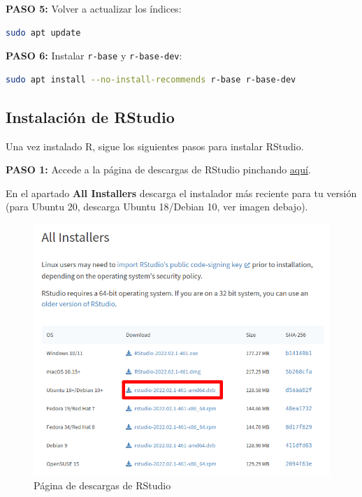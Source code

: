 \documentclass[
  title=normal,
  notoc,
  bib=normal]{mnye}
\newcommand{\passthrough}[1]{#1}
\begin{document}
\textbf{PASO 5: } Volver a actualizar los índices:

\begin{lstlisting}[language=bash]
sudo apt update 
\end{lstlisting}

\textbf{PASO 6: } Instalar \passthrough{\lstinline!r-base!} y \passthrough{\lstinline!r-base-dev!}:

\begin{lstlisting}[language=bash]
sudo apt install --no-install-recommends r-base r-base-dev 
\end{lstlisting}

\hypertarget{instalaciuxf3n-de-rstudio}{%
\subsection{Instalación de RStudio}\label{instalaciuxf3n-de-rstudio}}

Una vez instalado R, sigue los siguientes pasos para instalar RStudio.

\textbf{PASO 1: }
Accede a la página de descargas de RStudio pinchando \href{https://rstudio.com/products/rstudio/download/\#download}{aquí}.

En el apartado \textbf{All Installers} descarga el instalador más reciente para tu versión (para Ubuntu 20, descarga Ubuntu 18/Debian 10, ver imagen debajo).

\begin{figure}

{\centering \includegraphics[width=0.9\linewidth]{images/rstudio-ubuntu} 

}

\caption{Página de descargas de RStudio}\label{fig:unnamed-chunk-10}
\end{figure}
\end{document}

